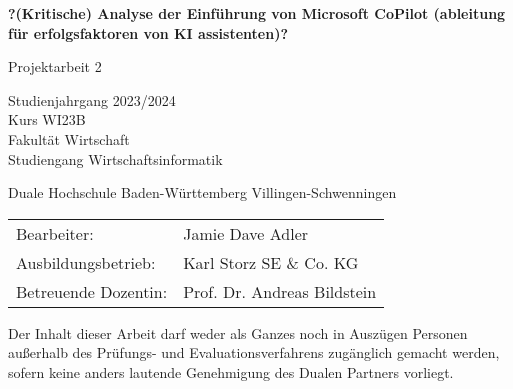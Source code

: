 \documentclass[12pt,a4paper,oneside]{article} %
\begin{document}
\begin{titlepage}
    \centering
    \vspace*{2cm} %

    {\huge\bfseries ?(Kritische) Analyse der Einführung von Microsoft CoPilot (ableitung für erfolgsfaktoren von KI assistenten)?}

    \vspace{2.5cm}

    {\Large Projektarbeit 2} %

    \vspace{0.5cm}

    {\normalsize Studienjahrgang 2023/2024\\ %
    Kurs WI23B\\ %
    Fakultät Wirtschaft\\
    Studiengang Wirtschaftsinformatik}

    \vspace{1cm}

    {\Large Duale Hochschule Baden-Württemberg Villingen-Schwenningen}

    \vspace{2.5cm}

    \begin{tabular}{@{}ll}
        Bearbeiter: & Jamie Dave Adler \\
        Ausbildungsbetrieb: & Karl Storz SE \& Co. KG \\
        Betreuende Dozentin: & Prof. Dr. Andreas Bildstein \\ %
    \end{tabular}

    \vfill %
\end{titlepage}
\setcounter{page}{1} %
\thispagestyle{empty} %

\newpage
\thispagestyle{empty} %
\vspace*{4cm} %
\noindent
Der Inhalt dieser Arbeit darf weder als Ganzes noch in Auszügen Personen außerhalb des Prüfungs- und Evaluationsverfahrens zugänglich gemacht werden, sofern keine anders lautende Genehmigung des Dualen Partners vorliegt.
\clearpage
\end{document}
